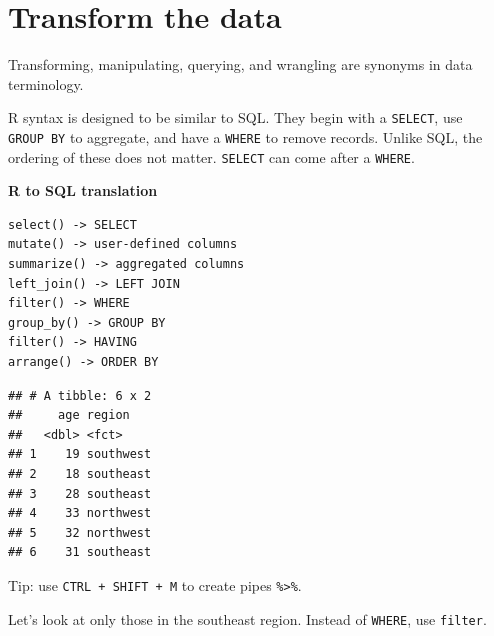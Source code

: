 \documentclass[
  openany]{book}
\newenvironment{Shaded}{\begin{snugshade}}{\end{snugshade}}
\newcommand{\KeywordTok}[1]{\textcolor[rgb]{0.13,0.29,0.53}{\textbf{#1}}}
\newcommand{\NormalTok}[1]{#1}
\newcommand{\OperatorTok}[1]{\textcolor[rgb]{0.81,0.36,0.00}{\textbf{#1}}}
\newcommand{\StringTok}[1]{\textcolor[rgb]{0.31,0.60,0.02}{#1}}
\begin{document}
\hypertarget{transform-the-data}{%
\section{Transform the data}\label{transform-the-data}}

Transforming, manipulating, querying, and wrangling are synonyms in data terminology.

R syntax is designed to be similar to SQL. They begin with a \texttt{SELECT}, use \texttt{GROUP\ BY} to aggregate, and have a \texttt{WHERE} to remove records. Unlike SQL, the ordering of these does not matter. \texttt{SELECT} can come after a \texttt{WHERE}.

\textbf{R to SQL translation}

\begin{verbatim}
select() -> SELECT
mutate() -> user-defined columns
summarize() -> aggregated columns
left_join() -> LEFT JOIN
filter() -> WHERE
group_by() -> GROUP BY
filter() -> HAVING
arrange() -> ORDER BY
\end{verbatim}

\begin{Shaded}
\end{Shaded}

\begin{verbatim}
## # A tibble: 6 x 2
##     age region   
##   <dbl> <fct>    
## 1    19 southwest
## 2    18 southeast
## 3    28 southeast
## 4    33 northwest
## 5    32 northwest
## 6    31 southeast
\end{verbatim}

Tip: use \texttt{CTRL\ +\ SHIFT\ +\ M} to create pipes \texttt{\%\textgreater{}\%}.

Let's look at only those in the southeast region. Instead of \texttt{WHERE}, use \texttt{filter}.

\begin{Shaded}
\end{Shaded}
\end{document}

